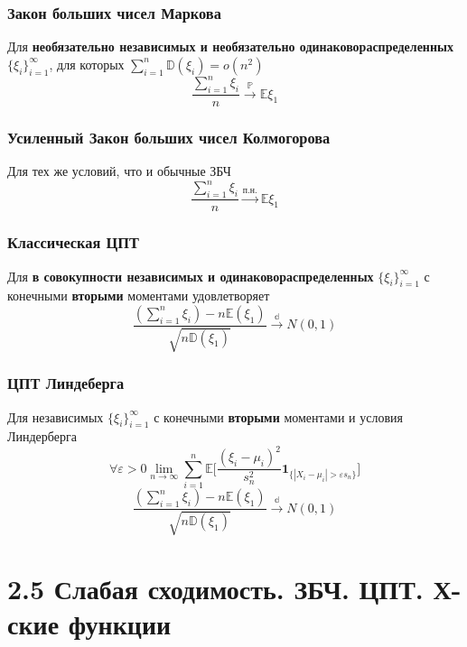\documentclass[a4paper, 14pt]{extarticle}
\begin{document}
\subsubsection*{Закон больших чисел Маркова}
Для \textbf{необязательно независимых и необязательно одинаковораспределенных} 
$\{\xi_i\}_{i=1}^{\infty}$, для которых $\sum_{i=1}^{n}\mathbb{D}(\xi_i) = o(n^2)$
$$\frac{\sum_{i=1}^n\xi_i}{n} \overset{\mathbb{P}}{\to} \mathbb{E}\xi_1$$

\subsubsection*{Усиленный Закон больших чисел Колмогорова}
Для тех же условий, что и обычные ЗБЧ
$$\frac{\sum_{i=1}^n\xi_i}{n} \overset{\textrm{п.н.}}{\to} \mathbb{E}\xi_1$$	

\subsubsection*{Классическая ЦПТ}
Для \textbf{в совокупности независимых и одинаковораспределенных} 
$\{\xi_i\}_{i=1}^{\infty}$ с конечными \textbf{вторыми} моментами удовлетворяет
$$\frac{(\sum_{i=1}^n\xi_i) - n\mathbb{E}(\xi_1)}{\sqrt{n\mathbb{D}(\xi_1)}} \overset{\mathbb{d}}{\to} N(0,1)$$	

\subsubsection*{ЦПТ Линдеберга}
Для независимых $\{\xi_i\}_{i=1}^{\infty}$ с конечными \textbf{вторыми} моментами и 
условия Линдерберга $$\forall \varepsilon > 0 \lim_{n\to \infty} \sum_{i=1}^{n}\mathbb{E}\Big[\frac{(\xi_i - \mu_i)^2}{s_n^2}\textbf{1}_{\{|X_i-\mu_i| > \varepsilon s_n\}}\Big]$$
$$\frac{(\sum_{i=1}^n\xi_i) - n\mathbb{E}(\xi_1)}{\sqrt{n\mathbb{D}(\xi_1)}} \overset{\mathbb{d}}{\to} N(0,1)$$	

	  
\newpage
\section*{2.5 Слабая сходимость. ЗБЧ. ЦПТ. Х-ские функции}
\end{document}

